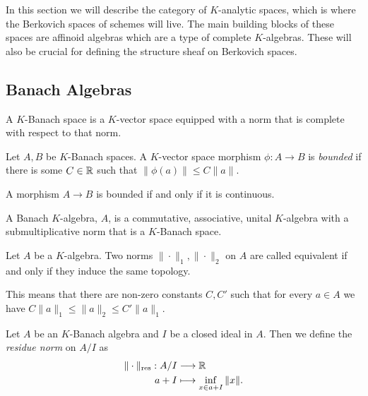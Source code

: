 In this section we will describe the category of $K$-analytic spaces, which is where the Berkovich spaces of schemes will live. 
The main building blocks of these spaces are affinoid algebras which are a type of complete $K$-algebras. 
These will also be  crucial for defining the structure sheaf on Berkovich spaces. 

\subsection{Banach Algebras} \label{sec:banach_algebras}
\begin{definition}
	A $K$-Banach space is a $K$-vector space equipped with a norm that is complete with respect to that norm. 
\end{definition}

\begin{definition}
	Let $A, B$ be $K$-Banach spaces. 
	A $K$-vector space morphism $\phi: A \to B$ is \emph{bounded} if there is some $C\in \mathbb{R}$ such that $\|\phi(a)\|\le C \|a\| $. 
\end{definition}

\begin{lemma}
	A morphism $A \to B$ is bounded if and only if it is continuous. 
\end{lemma}

\begin{definition}
	A Banach $K$-algebra, $A$, is a commutative, associative, unital $K$-algebra with a submultiplicative norm that is a $K$-Banach space.
\end{definition}
\begin{definition}
	Let $A$ be a $K$-algebra. 
	Two norms $\|\cdot \|_1, \|\cdot \|_2$ on $A$ are called equivalent if and only if they induce the same topology. 

	This means that there are non-zero constants $C, C'$ such that for every $ a\in A$ we have $C\|a\|_1 \le \|a\|_2 \le C'\|a\|_1$. 
\end{definition}

\begin{definition}
	Let $A$ be an $K$-Banach algebra and $I$ be a closed ideal in $A$. 
	Then we define the \emph{residue norm} on $A / I$ as 
	\begin{align*}
		\|\cdot \|_\text{res} : A / I &\longrightarrow \mathbb{R} \\
		a + I &\longmapsto \inf_{x \in a + I} \|x\|
	.\end{align*}
\end{definition}

